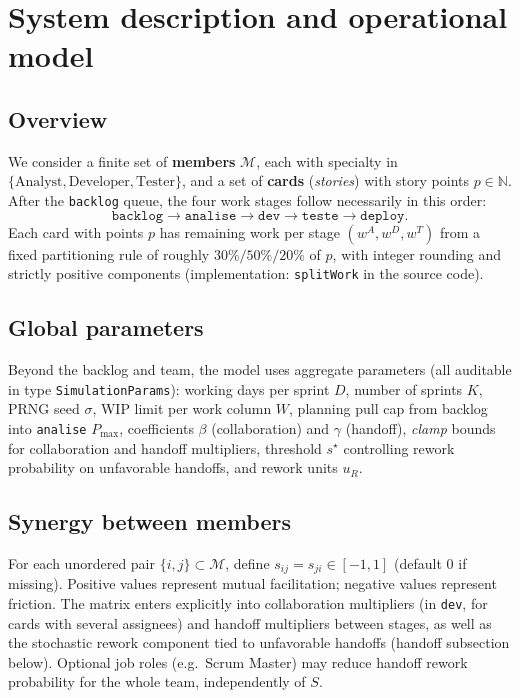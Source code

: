 \section{System description and operational model}
\label{sec:modelo}

\subsection{Overview}
We consider a finite set of \textbf{members} $\mathcal{M}$, each with specialty in $\{\text{Analyst},\text{Developer},\text{Tester}\}$, and a set of \textbf{cards} (\emph{stories}) with story points $p\in\mathbb{N}$. After the \texttt{backlog} queue, the four work stages follow necessarily in this order:
\[
\texttt{backlog}\rightarrow\texttt{analise}\rightarrow\texttt{dev}\rightarrow\texttt{teste}\rightarrow\texttt{deploy}.
\]
Each card with points $p$ has remaining work per stage $(w^A,w^D,w^T)$ from a fixed partitioning rule of roughly $30\%/50\%/20\%$ of $p$, with integer rounding and strictly positive components (implementation: \texttt{splitWork} in the source code).

\subsection{Global parameters}
Beyond the backlog and team, the model uses aggregate parameters (all auditable in type \texttt{SimulationParams}): working days per sprint $D$, number of sprints $K$, PRNG seed $\sigma$, WIP limit per work column $W$, planning pull cap from backlog into \texttt{analise} $P_{\max}$, coefficients $\beta$ (collaboration) and $\gamma$ (handoff), \emph{clamp} bounds for collaboration and handoff multipliers, threshold $s^\star$ controlling rework probability on unfavorable handoffs, and rework units $u_R$.

\subsection{Synergy between members}
For each unordered pair $\{i,j\}\subset\mathcal{M}$, define $s_{ij}=s_{ji}\in[-1,1]$ (default $0$ if missing). Positive values represent mutual facilitation; negative values represent friction. The matrix enters explicitly into collaboration multipliers (in \texttt{dev}, for cards with several assignees) and handoff multipliers between stages, as well as the stochastic rework component tied to unfavorable handoffs (handoff subsection below). Optional job roles (e.g.\ Scrum Master) may reduce handoff rework probability for the whole team, independently of $S$.

